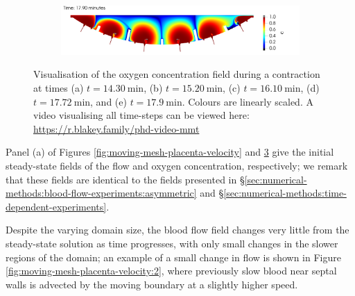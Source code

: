 \begin{figure}
\begin{subfigure}{\textwidth}
                    \caption{}
                    \label{fig:moving-mesh-placenta-transport:4}
                \end{subfigure}
                \begin{subfigure}{\textwidth}
                    \includegraphics[width=\textwidth]{diagrams/results-contractions/placenta-moving-mesh/mm-placenta-transport.0100.png}
                    \caption{}
                    \label{fig:moving-mesh-placenta-transport:5}
                \end{subfigure}
                \caption{Visualisation of the oxygen concentration field during a contraction at times (a) $t=\qty{14.30}{\minute}$, (b) $t=\qty{15.20}{\minute}$, (c) $t=\qty{16.10}{\minute}$, (d) $t=\qty{17.72}{\minute}$, and (e) $t=\qty{17.9}{\minute}$. Colours are linearly scaled. A video visualising all time-steps can be viewed here: \url{https://r.blakey.family/phd-video-mmt}}
                \label{fig:moving-mesh-placenta-transport}
            \end{figure}

            Panel (a) of Figures \ref{fig:moving-mesh-placenta-velocity} and \ref{fig:moving-mesh-placenta-transport} give the initial steady-state fields of the flow and oxygen concentration, respectively; we remark that these fields are identical to the fields presented in \S\ref{sec:numerical-methods:blood-flow-experiments:asymmetric} and \S\ref{sec:numerical-methods:time-dependent-experiments}.
            
            Despite the varying domain size, the blood flow field changes very little from the steady-state solution as time progresses, with only small changes in the slower regions of the domain; an example of a small change in flow is shown in Figure \ref{fig:moving-mesh-placenta-velocity:2}, where previously slow blood near septal walls is advected by the moving boundary at a slightly higher speed.
            
